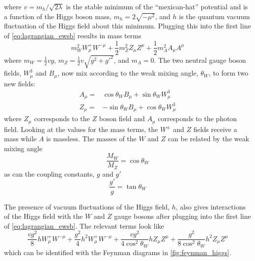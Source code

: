 where $v=m_h /\sqrt{2 \lambda}$ is the stable minimum of the 
``mexican-hat'' potential and is a function of the Higgs boson 
mass, $m_h = 2 \sqrt{- \mu^2}$, and $h$ is the quantum 
vacuum fluctuation of the Higgs field about this minimum.
Plugging this into the first line of \eqn\eqref{eq:lagrangian_ewsb}
results in mass terms
\begin{equation}
m_W^2 W_{\mu}^+ W^{-\mu} + \frac{1}{2}m_Z^2 Z_{\mu} Z^{\mu} + \frac{1}{2} m_A^2 A_{\mu} A^{\mu}
\end{equation}
where $m_W = \frac{1}{2} vg$, $m_Z=\frac{1}{2} v\sqrt{g^2+g'^2}$, and 
$m_A=0$.
The two neutral gauge boson fields, $W_{\mu}^3$ and $B_{\mu}$, 
now mix according to the weak mixing angle, $\theta_W$, to form two new fields:
\begin{align}
A_{\mu} =& \cos\theta_W B_{\mu} + \sin\theta_W W_{\mu}^3 \\
Z_{\mu} =& -\sin\theta_W B_{\mu} + \cos\theta_W W_{\mu}^3
\end{align}
where $Z_{\mu}$ corresponds to the $Z$ boson field
and $A_{\mu}$ corresponds to the photon field.
Looking at the values for the mass terms, the $W^{\pm}$ and $Z$ fields
receive a mass while $A$ is massless.
The masses of the $W$ and $Z$ can be related by the weak mixing angle
\begin{equation}
\frac{M_W}{M_Z} = \cos \theta_W
\end{equation}
as can the coupling constants, $g$ and $g'$
\begin{equation}
\frac{g'}{g} = \tan\theta_W
\end{equation}



The presence of vacuum fluctuations of the Higgs field, $h$, also 
gives interactions of the Higgs field with the $W$ and $Z$ gauge bosons
after plugging into the first line of \eqn\eqref{eq:lagrangian_ewsb}.
The relevant terms look like
\begin{equation}
\frac{vg^2}{8} h W^+_{\mu}W^{-\mu} + \frac{g^2}{4} h^2W^{+}_{\mu}W^{-\mu}
+\frac{vg^2}{4 \cos^2\theta_W} h Z_{\mu} Z^{\mu} 
+\frac{g^2}{8\cos^2\theta_W} h^2 Z_{\mu}Z^{\mu}
\end{equation}
which can be identified with the Feynman diagrams in \fig\ref{fig:feynman_higgs}.

